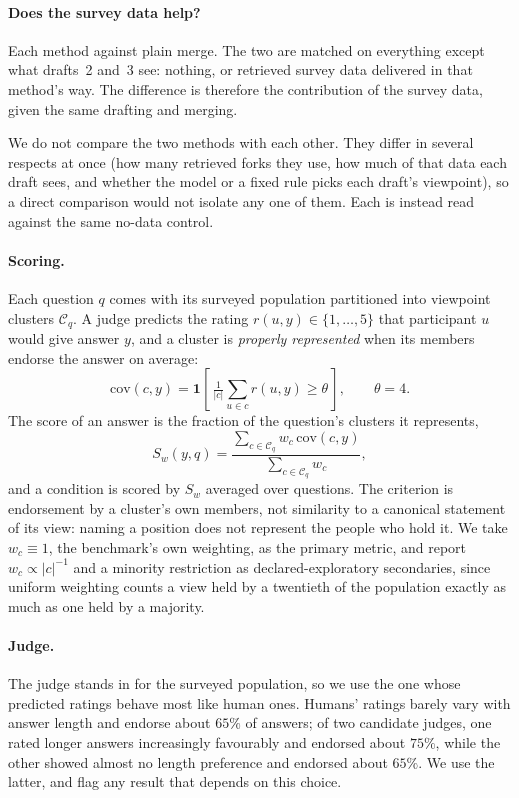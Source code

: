 \documentclass[11pt]{article}
\begin{document}
\paragraph{Does the survey data help?} Each method against plain merge. The two
are matched on everything except what drafts~2 and~3 see: nothing, or retrieved
survey data delivered in that method's way. The difference is therefore the
contribution of the survey data, given the same drafting and merging.

We do not compare the two methods with each other. They differ in several
respects at once (how many retrieved forks they use, how much of that data each
draft sees, and whether the model or a fixed rule picks each draft's viewpoint),
so a direct comparison would not isolate any one of them. Each is instead read
against the same no-data control.

\paragraph{Scoring.} Each question $q$ comes with its surveyed population
partitioned into viewpoint clusters $\mathcal{C}_q$. A judge predicts the rating
$r(u, y) \in \{1, \dots, 5\}$ that participant $u$ would give answer $y$, and a
cluster is \emph{properly represented} when its members endorse the answer on
average:
\begin{equation}
  \mathrm{cov}(c, y) = \mathbf{1}\!\left[\,
    \tfrac{1}{|c|}\textstyle\sum_{u \in c} r(u, y) \ge \theta \,\right],
  \qquad \theta = 4 .
\end{equation}
The score of an answer is the fraction of the question's clusters it represents,
\begin{equation}
  S_w(y, q) = \frac{\sum_{c \in \mathcal{C}_q} w_c\, \mathrm{cov}(c, y)}
                   {\sum_{c \in \mathcal{C}_q} w_c},
\end{equation}
and a condition is scored by $S_w$ averaged over questions. The criterion is
endorsement by a cluster's own members, not similarity to a canonical statement
of its view: naming a position does not represent the people who hold it. We
take $w_c \equiv 1$, the benchmark's own weighting, as the primary metric, and
report $w_c \propto |c|^{-1}$ and a minority restriction as declared-exploratory
secondaries, since uniform weighting counts a view held by a twentieth of the
population exactly as much as one held by a majority.

\paragraph{Judge.} The judge stands in for the surveyed population, so we use
the one whose predicted ratings behave most like human ones. Humans' ratings
barely vary with answer length and endorse about $65\%$ of answers; of two
candidate judges, one rated longer answers increasingly favourably and endorsed
about $75\%$, while the other showed almost no length preference and endorsed
about $65\%$. We use the latter, and flag any result that depends on this
choice.
\end{document}
